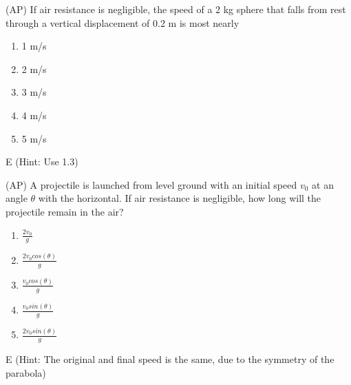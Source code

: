 
\begin{question}
(AP) If air resistance is negligible, the speed of a 2 kg sphere that falls from rest through a vertical displacement of 0.2 m is most nearly
\begin{multicols}{5}
\begin{enumerate}[label=(\alph*)]
    \item 1 m/s
    \item 2 m/s
    \item 3 m/s
    \item 4 m/s
    \item 5 m/s
\end{enumerate}
\end{multicols}
\end{question}

\begin{solution}
E (Hint: Use 1.3)
\end{solution}


\begin{question}
(AP) A projectile is launched from level ground with an initial speed $v_0$ at an angle $\theta$ with the horizontal. If air resistance is negligible, how long will the projectile remain in the air?
\begin{multicols}{5}
\begin{enumerate}[label=(\alph*)]
    \item $\frac{2v_0}{g}$
    \item $\frac{2v_0cos(\theta)}{g}$
    \item $\frac{v_0cos(\theta)}{g}$
    \item $\frac{v_0sin(\theta)}{g}$
    \item $\frac{2v_0sin(\theta)}{g}$
\end{enumerate}
\end{multicols}
\end{question}

\begin{solution}
E (Hint: The original and final speed is the same, due to the symmetry of the parabola)
\end{solution}


